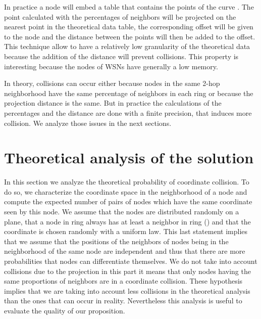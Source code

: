 \documentclass[a4paper]{article}
\begin{document}
In practice a node will embed a table that contains the points of the curve . The point calculated with the percentages of neighbors will be projected on the nearest point in the theoretical data table, the corresponding offset will be given to the node and the distance between the points will then be added to the offset. This technique allow to have a relatively low granularity of the theoretical data because the addition of the distance will prevent collisions. This property is interesting because the nodes of WSNs have generally a low memory.

In theory, collisions can occur either because nodes in the same 2-hop neighborhood have the same percentage of neighbors in each ring or because the projection distance is the same. But in practice the calculations of the percentages and the distance are done with a finite precision, that induces more collision. We analyze those issues in the next sections.

\section{Theoretical analysis of the solution}
In this section we analyze the theoretical probability of coordinate collision. To do so, we characterize the coordinate space in the neighborhood of a node and compute the expected number of pairs of nodes which have the same coordinate seen by this node. We assume that the nodes are distributed randomly on a plane, that a node in ring  always has at least a neighbor in ring  () and that the coordinate is chosen randomly with a uniform law. This last statement implies that we assume that the positions of the neighbors of nodes being in the neighborhood of the same node are independent and thus that there are more probabilities that nodes can differentiate themselves. We do not take into account collisions due to the projection in this part it means that only nodes having the same proportions of neighbors are in a coordinate collision. These hypothesis implies that we are taking into account less collisions in the theoretical analysis than the ones that can occur in reality. Nevertheless this analysis is useful to evaluate the quality of our proposition.
\end{document}
